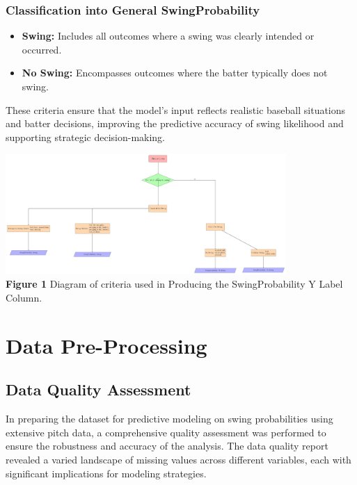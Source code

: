\documentclass[12pt]{article}
\begin{document}
\subsubsection{Classification into General SwingProbability}
\begin{itemize}
    \item \textbf{Swing:} Includes all outcomes where a swing was clearly intended or occurred.
    \item \textbf{No Swing:} Encompasses outcomes where the batter typically does not swing.
      
\end{itemize}
    
These criteria ensure that the model's input reflects realistic baseball situations and batter decisions, improving the predictive accuracy of swing likelihood and supporting strategic decision-making.

\begin{center}
    
        \centering
        \includegraphics[width=0.8\textwidth]{flow_chart (2).jpg} %
        \textbf{\\Figure 1} Diagram of criteria used in Producing the SwingProbability Y Label Column.
        
\end{center}


\section{Data Pre-Processing}

\subsection{Data Quality Assessment}
In preparing the dataset for predictive modeling on swing probabilities using extensive pitch data, a comprehensive quality assessment was performed to ensure the robustness and accuracy of the analysis. The data quality report revealed a varied landscape of missing values across different variables, each with significant implications for modeling strategies.
\end{document}
